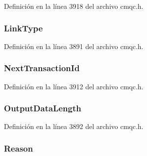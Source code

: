 Definición en la línea 3918 del archivo cmqc.\+h.

\hypertarget{structtag_m_q_c_i_h_a7aeee4930e26b197d1c9710b2ec9283a}{}
\subsubsection[{Link\+Type}]{ Link\+Type}\label{structtag_m_q_c_i_h_a7aeee4930e26b197d1c9710b2ec9283a}


Definición en la línea 3891 del archivo cmqc.\+h.

\hypertarget{structtag_m_q_c_i_h_aaf571f6f5251efbe08da4270afacdd8d}{}
\subsubsection[{Next\+Transaction\+Id}]{ Next\+Transaction\+Id}\label{structtag_m_q_c_i_h_aaf571f6f5251efbe08da4270afacdd8d}


Definición en la línea 3912 del archivo cmqc.\+h.

\hypertarget{structtag_m_q_c_i_h_a1a9ce6919a7f70570ceb429273b9a1a7}{}
\subsubsection[{Output\+Data\+Length}]{ Output\+Data\+Length}\label{structtag_m_q_c_i_h_a1a9ce6919a7f70570ceb429273b9a1a7}


Definición en la línea 3892 del archivo cmqc.\+h.

\hypertarget{structtag_m_q_c_i_h_ac2f0378cb0c66c5f91625822e53d7bae}{}
\subsubsection[{Reason}]{ Reason}\label{structtag_m_q_c_i_h_ac2f0378cb0c66c5f91625822e53d7bae}



